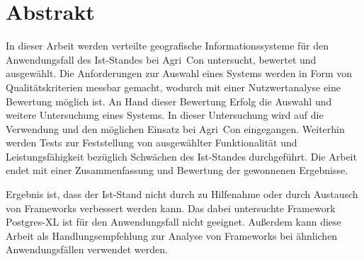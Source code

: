 
\chapter*{Abstrakt}
\label{sec:Abstrakt}
In dieser Arbeit werden verteilte geografische Informationssysteme für den Anwendungsfall des Ist-Standes bei Agri~Con untersucht, bewertet und ausgewählt.
Die Anforderungen zur Auswahl eines Systems werden in Form von Qualitätskriterien messbar gemacht, wodurch mit einer Nutzwertanalyse eine Bewertung möglich ist.
An Hand dieser Bewertung Erfolg die Auswahl und weitere Untersuchung eines Systems.
In dieser Untersuchung wird auf die Verwendung und den möglichen Einsatz bei Agri~Con eingegangen.
Weiterhin werden Tests zur Feststellung von ausgewählter Funktionalität und Leistungsfähigkeit bezüglich Schwächen des Ist-Standes durchgeführt.
Die Arbeit endet mit einer Zusammenfassung und Bewertung der gewonnenen Ergebnisse.

Ergebnis ist, dass der Ist-Stand nicht durch zu Hilfenahme oder durch Austausch von Frameworks verbessert werden kann.
Das dabei untersuchte Framework Postgres-XL ist für den Anwendungsfall nicht geeignet.
Außerdem kann diese Arbeit als Handlungsempfehlung zur Analyse von Frameworks bei ähnlichen Anwendungsfällen verwendet werden.